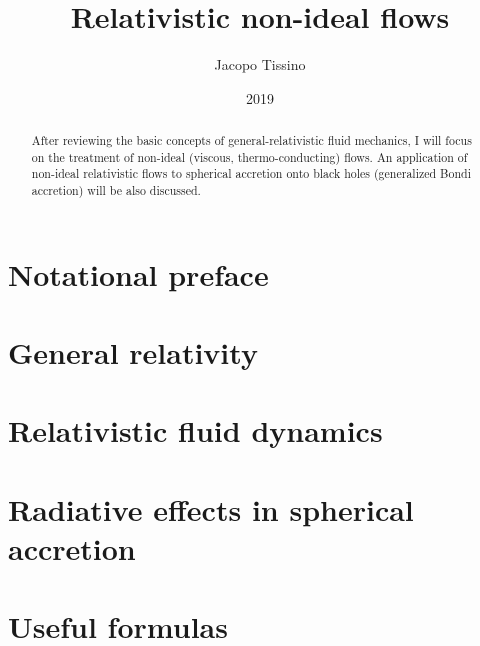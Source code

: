 \documentclass[a4paper, 11pt]{article}
\title{Relativistic non-ideal flows}
\author{Jacopo Tissino}
\date{2019}
\begin{document}


\begin{abstract}
After reviewing the basic concepts of general-relativistic fluid mechanics, I will focus on the treatment of non-ideal
(viscous, thermo-conducting) flows. An application of non-ideal relativistic flows to spherical accretion onto black holes
(generalized Bondi accretion) will be also discussed.
\end{abstract}

\setcounter{tocdepth}{4}
\tableofcontents

\section{Notational preface} \label{sec:notational-preface}


\section{General relativity} \label{sec:general-relativity}


\section{Relativistic fluid dynamics} \label{sec:fluid-dynamics}


\section{Radiative effects in spherical accretion} \label{sec:radiative-effects}


\section{Useful formulas}


\printbibliography[title={Bibliography}]

\end{document}
